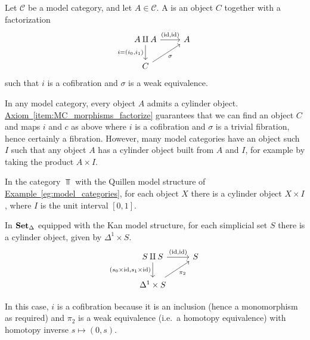 \documentclass[main.tex]{subfiles}
\begin{document}
\begin{definition}
  \label{def:cylinder_object}
  Let $\mathcal{C}$ be a model category, and let $A \in \mathcal{C}$. A  is an object $C$ together with a factorization
  \begin{equation*}
    \begin{tikzcd}
      A \amalg A
      \arrow[r, "{(\id, \id)}"]
      \arrow[d, swap, "{i = (i_{0}, i_{1})}"]
      & A
      \\
      C
      \arrow[ur, swap, "\sigma"]
    \end{tikzcd}
  \end{equation*}
  such that $i$ is a cofibration and $\sigma$ is a weak equivalence.
\end{definition}

In any model category, every object $A$ admits a cylinder object. \hyperref[item:MC_morphisms_factorize]{Axiom~\ref*{item:MC_morphisms_factorize}} guarantees that we can find an object $C$ and maps $i$ and $c$ as above where $i$ is a cofibration and $\sigma$ is a trivial fibration, hence certainly a fibration. However, many model categories have an object such $I$ such that any object $A$ has a cylinder object built from $A$ and $I$, for example by taking the product $A \times I$.

\begin{example}
  \label{eg:cylinder_objects_in_top}
  In the category $\Top$ with the Quillen model structure of \hyperref[eg:model_categories]{Example~\ref*{eg:model_categories}}, for each object $X$ there is a cylinder object $X \times I$, where $I$ is the unit interval $[0, 1]$.
\end{example}

\begin{example}
  \label{eg:cylinder_objects_in_sset}
  In $\operatorname{\mathbf{Set}_{\Delta}}$ equipped with the Kan model structure, for each simplicial set $S$ there is a cylinder object, given by $\Delta^{1} \times S$.
  \begin{equation*}
    \begin{tikzcd}
      S \amalg S
      \arrow[r, "{(\id, \id)}"]
      \arrow[d, swap, "{(s_{0} \times \id, s_{1} \times \id)}"]
      & S
      \\
      \Delta^{1} \times S
      \arrow[ur, swap, "\pi_{2}"]
    \end{tikzcd}
  \end{equation*}

  In this case, $i$ is a cofibration because it is an inclusion (hence a monomorphism as required) and $\pi_{2}$ is a weak equivalence (i.e.\ a homotopy equivalence) with homotopy inverse $s \mapsto (0, s)$.
\end{example}
\end{document}
